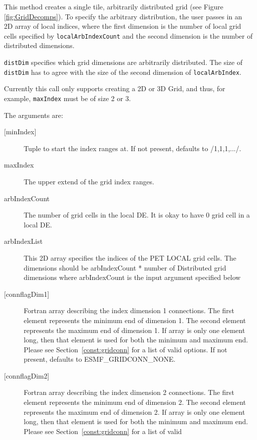   
   This method creates a single tile, arbitrarily distributed grid
   (see Figure \ref{fig:GridDecomps}).
   To specify the arbitrary distribution, the user passes in an 2D array
   of local indices, where the first dimension is the number of local grid cells
   specified by {\tt localArbIndexCount} and the second dimension is the number of distributed
   dimensions.
  
   {\tt distDim} specifies which grid dimensions are arbitrarily distributed. The
   size of {\tt distDim} has to agree with the size of the second dimension of
   {\tt localArbIndex}.
  
   Currently this call
   only supports creating a 2D or 3D Grid, and thus, for example, {\tt maxIndex} must be of size 2 or 3.
  
  
   The arguments are:
   \begin{description}
   \item[{[minIndex]}]
        Tuple to start the index ranges at. If not present, defaults
        to /1,1,1,.../.
   \item[maxIndex]
        The upper extend of the grid index ranges.
   \item[arbIndexCount]
        The number of grid cells in the local DE. It is okay to have 0
        grid cell in a local DE.
   \item[arbIndexList]
        This 2D array specifies the indices of the PET LOCAL grid cells.  The
        dimensions should be arbIndexCount * number of Distributed grid dimensions
        where arbIndexCount is the input argument specified below
   \item[{[connflagDim1]}]
        Fortran array describing the index dimension 1 connections.
        The first element represents the minimum end of dimension 1.
        The second element represents the maximum end of dimension 1.
        If array is only one element long, then that element is used
        for both the minimum and maximum end.
        Please see Section~\ref{const:gridconn} for a list of valid
        options. If not present, defaults to ESMF\_GRIDCONN\_NONE.
   \item[{[connflagDim2]}]
        Fortran array describing the index dimension 2 connections.
        The first element represents the minimum end of dimension 2.
        The second element represents the maximum end of dimension 2.
        If array is only one element long, then that element is used
        for both the minimum and maximum end.
        Please see Section~\ref{const:gridconn} for a list of valid

\end{description}
